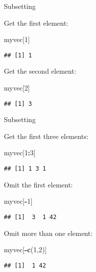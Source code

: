 \documentclass[ignorenonframetext,]{beamer}
\newenvironment{Shaded}{\begin{snugshade}}{\end{snugshade}}
\newcommand{\DecValTok}[1]{\textcolor[rgb]{0.00,0.00,0.81}{#1}}
\newcommand{\KeywordTok}[1]{\textcolor[rgb]{0.13,0.29,0.53}{\textbf{#1}}}
\newcommand{\NormalTok}[1]{#1}
\newcommand{\OperatorTok}[1]{\textcolor[rgb]{0.81,0.36,0.00}{\textbf{#1}}}
\begin{document}
\begin{frame}[fragile]{Subsetting}
\protect\hypertarget{subsetting}{}

Get the first element:

\begin{Shaded}
\begin{Highlighting}[]
\NormalTok{myvec[}\DecValTok{1}\NormalTok{]}
\end{Highlighting}
\end{Shaded}

\begin{verbatim}
## [1] 1
\end{verbatim}

Get the second element:

\begin{Shaded}
\begin{Highlighting}[]
\NormalTok{myvec[}\DecValTok{2}\NormalTok{]}
\end{Highlighting}
\end{Shaded}

\begin{verbatim}
## [1] 3
\end{verbatim}

\end{frame}

\begin{frame}[fragile]{Subsetting}
\protect\hypertarget{subsetting-1}{}

Get the first three elements:

\begin{Shaded}
\begin{Highlighting}[]
\NormalTok{myvec[}\DecValTok{1}\OperatorTok{:}\DecValTok{3}\NormalTok{]}
\end{Highlighting}
\end{Shaded}

\begin{verbatim}
## [1] 1 3 1
\end{verbatim}

Omit the first element:

\begin{Shaded}
\begin{Highlighting}[]
\NormalTok{myvec[}\OperatorTok{-}\DecValTok{1}\NormalTok{]}
\end{Highlighting}
\end{Shaded}

\begin{verbatim}
## [1]  3  1 42
\end{verbatim}

Omit more than one element:

\begin{Shaded}
\begin{Highlighting}[]
\NormalTok{myvec[}\OperatorTok{-}\KeywordTok{c}\NormalTok{(}\DecValTok{1}\NormalTok{,}\DecValTok{2}\NormalTok{)]}
\end{Highlighting}
\end{Shaded}

\begin{verbatim}
## [1]  1 42
\end{verbatim}

\end{frame}
\end{document}

